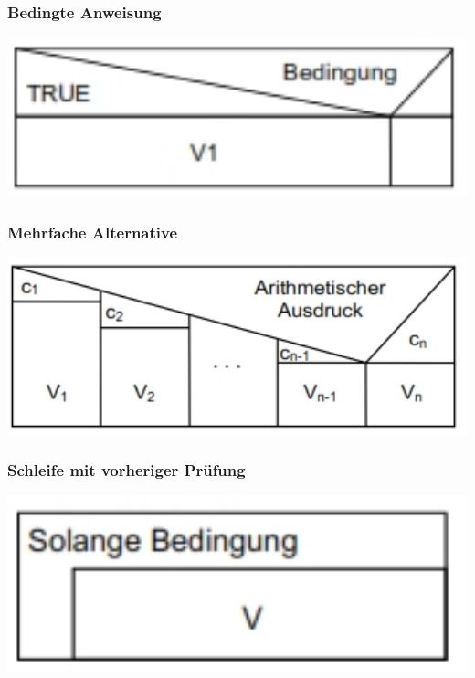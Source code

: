 		\begin{minipage}[t]{6 cm}
			\subsubsection{Bedingte Anweisung}
				\includegraphics[width=1\textwidth]{pics/Nassi_bedingte_Verarbeitung.jpg}
								
			\subsubsection{Mehrfache Alternative}
				\includegraphics[width=1\textwidth]{pics/Nassi_mehrfache_Alternative.jpg}	
									
			\subsubsection{Schleife mit vorheriger Prüfung}
				\includegraphics[width=1\textwidth]{pics/Nassi_While.jpg}
					
		\end{minipage}
